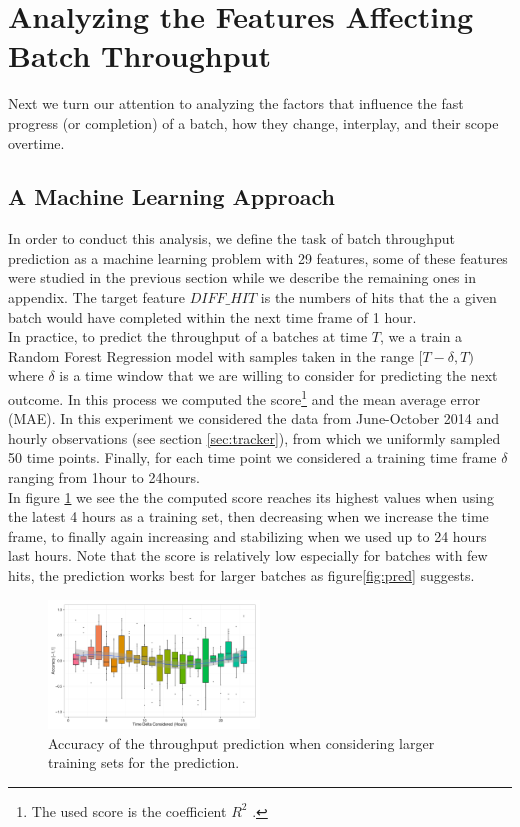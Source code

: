 \section{Analyzing the Features Affecting Batch Throughput}\label{sec:throughput}
Next we turn our attention to analyzing the factors that influence the fast progress (or completion) of a batch, how they change, interplay, and their scope overtime.
\subsection{A Machine Learning Approach}
In order to conduct this analysis, we define the task of batch throughput prediction as a machine learning problem with 29 features, some of these features were studied in the previous section while we describe the remaining ones in appendix. The target feature $DIFF\_HIT$ is the numbers of hits that the a given batch would have completed within the next time frame of 1 hour.\\
In practice, to predict the throughput of a batches at time $T$, we a train a Random Forest Regression model with samples taken in the range $[T-\delta, T)$ where $\delta$ is a time window that we are willing to consider for predicting the next outcome. In this process we computed the score\footnote{The used score is the coefficient $R^2$ \cite{sklearn}.} and the mean average error (MAE).
In this experiment we considered the data from June-October 2014 and hourly observations (see section \ref{sec:tracker}), from which we uniformly sampled 50 time points. Finally, for each time point we considered a training time frame $\delta$ ranging from 1hour to 24hours. \\

In figure \ref{fig:accuracy} we see the the computed score reaches its highest values when using the latest 4 hours as a training set, then decreasing when we increase the time frame, to finally again increasing and stabilizing when we used up to 24 hours last hours. Note that the score is relatively low especially for batches with few hits, the prediction works best for larger batches as figure\ref{fig:pred} suggests.\\

\begin{figure}[htbp]
	\centering
		\includegraphics[width=0.5\textwidth]{figures/ML_accuracy}
	\caption{Accuracy of the throughput prediction when considering larger training sets for the prediction.}
	\label{fig:accuracy}
\end{figure}

